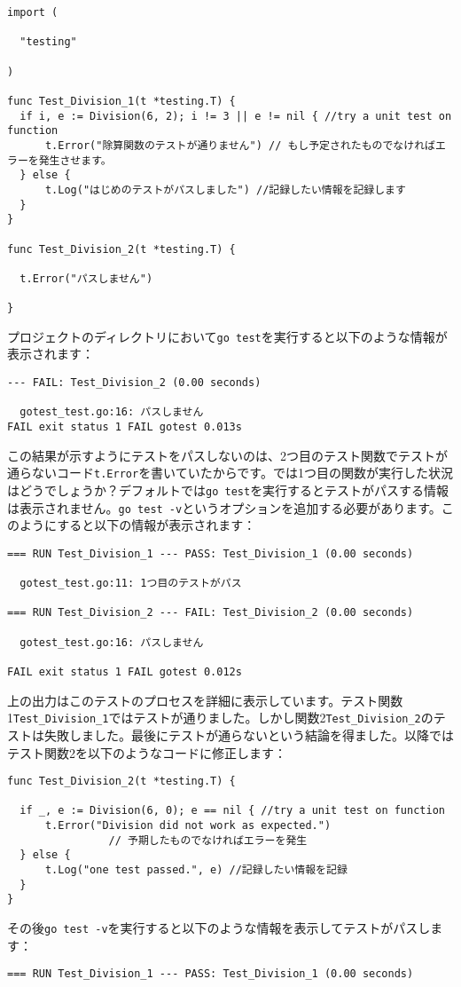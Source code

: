 \begin{enumerate}
\begin{lstlisting}[numbers=none]
import (

  "testing"

)

func Test_Division_1(t *testing.T) {
  if i, e := Division(6, 2); i != 3 || e != nil { //try a unit test on function
      t.Error("除算関数のテストが通りません") // もし予定されたものでなければエラーを発生させます。
  } else {
      t.Log("はじめのテストがパスしました") //記録したい情報を記録します
  }
}

func Test_Division_2(t *testing.T) {

  t.Error("パスしません")

}
\end{lstlisting}
プロジェクトのディレクトリにおいて\texttt{go test}を実行すると以下のような情報が表示されます：
\begin{lstlisting}[numbers=none]
 --- FAIL: Test_Division_2 (0.00 seconds)

  gotest_test.go:16: パスしません
FAIL exit status 1 FAIL gotest 0.013s
\end{lstlisting}
この結果が示すようにテストをパスしないのは、2つ目のテスト関数でテストが通らないコード\texttt{t.Error}を書いていたからです。では1つ目の関数が実行した状況はどうでしょうか？デフォルトでは\texttt{go test}を実行するとテストがパスする情報は表示されません。\texttt{go test -v}というオプションを追加する必要があります。このようにすると以下の情報が表示されます：
\begin{lstlisting}[numbers=none]
 === RUN Test_Division_1 --- PASS: Test_Division_1 (0.00 seconds)

  gotest_test.go:11: 1つ目のテストがパス

=== RUN Test_Division_2 --- FAIL: Test_Division_2 (0.00 seconds)

  gotest_test.go:16: パスしません

FAIL exit status 1 FAIL gotest 0.012s
\end{lstlisting}
上の出力はこのテストのプロセスを詳細に表示しています。テスト関数1\texttt{Test\_Division\_1}ではテストが通りました。しかし関数2\texttt{Test\_Division\_2}のテストは失敗しました。最後にテストが通らないという結論を得ました。以降ではテスト関数2を以下のようなコードに修正します：
\begin{lstlisting}[numbers=none]
 func Test_Division_2(t *testing.T) {

  if _, e := Division(6, 0); e == nil { //try a unit test on function
      t.Error("Division did not work as expected.")
                // 予期したものでなければエラーを発生
  } else {
      t.Log("one test passed.", e) //記録したい情報を記録
  }
}
\end{lstlisting}
その後\texttt{go test -v}を実行すると以下のような情報を表示してテストがパスします：
\begin{lstlisting}[numbers=none]
 === RUN Test_Division_1 --- PASS: Test_Division_1 (0.00 seconds)


\end{lstlisting}
\end{enumerate}
